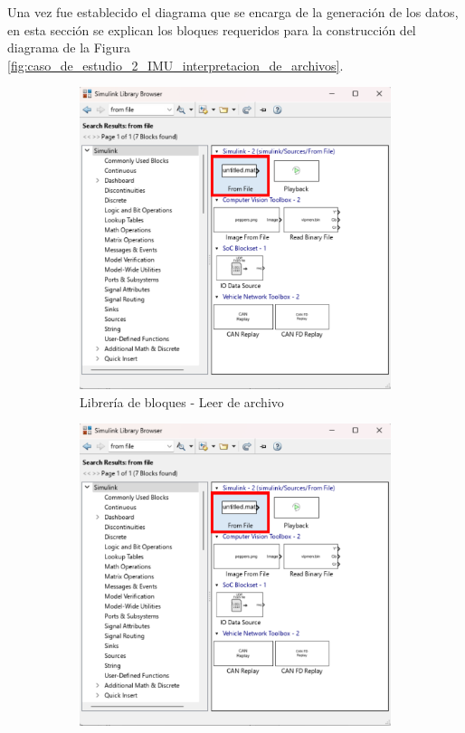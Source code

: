 Una vez fue establecido el diagrama que se encarga de la generación de los datos, en esta sección se explican los bloques requeridos para la construcción del diagrama de la Figura \ref{fig:caso_de_estudio_2_IMU_interpretacion_de_archivos}.

\begin{figure}[htbp]
    \centering
    \begin{subfigure}[b]{0.35\textwidth}
        \centering
        \includegraphics[width=\textwidth]{fig/Capitulo5/Caso_de_estudio_IMU/Generador_de_salidas/libreia_de_bloques_from_file.pdf}
        \caption{Librería de bloques - Leer de archivo}
        \label{fig:lib_bloques_from_file_IMU}
    \end{subfigure}
    \hfill
    \begin{subfigure}[b]{0.45\textwidth}
        \centering
        \includegraphics[width=\textwidth]{fig/Capitulo5/Caso_de_estudio_IMU/Generador_de_salidas/libreia_de_bloques_from_file.pdf}

\end{subfigure}
\end{figure}
